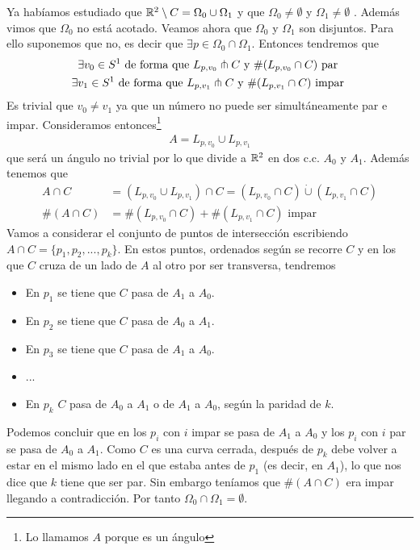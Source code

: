 Ya habíamos estudiado que $\mathbb{R}^2 \setminus C = \Omega_0 \cup \Omega_1$  y que $\Omega_0\neq \emptyset$ y $\Omega_1 \neq \emptyset$ . Además vimos que $\Omega_0$ no está acotado. Veamos ahora que $\Omega_0$ y $\Omega_1$ son disjuntos. Para ello suponemos que no, es decir que $\exists p\in \Omega_0\cap \Omega_1$. Entonces tendremos que
\begin{gather*}
    \exists v_0\in S^1 \text{ de forma que } L_{p,v_0}\pitchfork C \text{ y } \#(L_{p,v_0} \cap C) \text{ par }\\
    \exists v_1\in S^1 \text{ de forma que } L_{p,v_1}\pitchfork C \text{ y } \#(L_{p,v_1} \cap C) \text{ impar }
\end{gather*}
Es trivial que $v_0\neq v_1$ ya que un número no puede ser simultáneamente par e impar. Consideramos entonces\footnote{Lo llamamos $A$ porque es un ángulo}
\begin{gather*}
    A = L_{p,v_0} \cup L_{p, v_1}
\end{gather*}
que será un ángulo no trivial por lo que divide a $\mathbb{R}^2$ en dos c.c. $A_0$ y $A_1$. Además tenemos que
\begin{align*}
    A\cap C &= (L_{p, v_0} \cup L_{p, v_1}) \cap C = (L_{p,v_0} \cap C) \dot{\cup} (L_{p, v_1}\cap C)\\
    \#(A\cap C) &= \# (L_{p,v_0} \cap C) + \#(L_{p,v_1} \cap C) \text{ impar}
\end{align*}
Vamos a considerar el conjunto de puntos de intersección escribiendo $A\cap C = \{p_1, p_2, ..., p_k\}$. En estos puntos, ordenados según se recorre $C$ y en los que $C$ cruza de un lado de $A$ al otro por ser transversa, tendremos
\begin{itemize}[label=-, noitemsep]
    \item En $p_1$ se tiene que $C$ pasa de $A_1$ a $A_0$.
    \item En $p_2$ se tiene que $C$ pasa de $A_0$ a $A_1$.
    \item En $p_3$ se tiene que $C$ pasa de $A_1$ a $A_0$.
    \item ...
    \item En $p_k$ $C$ pasa de $A_0$ a $A_1$ o de $A_1$ a $A_0$, según la paridad de $k$.
\end{itemize}
Podemos concluir que en los $p_i$ con $i$ impar se pasa de $A_1$ a $A_0$ y los $p_i$ con $i$ par se pasa de $A_0$ a $A_1$. Como $C$ es una curva cerrada, después de $p_k$ debe volver a estar en el mismo lado en el que estaba antes de $p_1$ (es decir, en $A_1$), lo que nos dice que $k$ tiene que ser par. Sin embargo teníamos que $\#(A\cap C)$ era impar llegando a contradicción. Por tanto $\Omega_0\cap \Omega_1 = \emptyset$.\\

